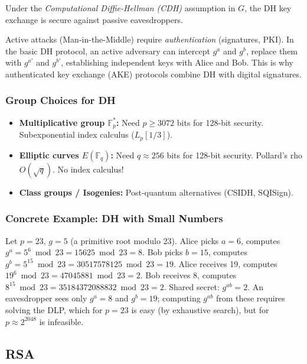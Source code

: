 \begin{theorem}[Security of DH]
Under the \emph{Computational Diffie-Hellman (CDH)} assumption in $G$, the DH key exchange is secure against passive eavesdroppers.
\end{theorem}

Active attacks (Man-in-the-Middle) require \emph{authentication} (signatures, PKI). In the basic DH protocol, an active adversary can intercept $g^a$ and $g^b$, replace them with $g^{a'}$ and $g^{b'}$, establishing independent keys with Alice and Bob. This is why authenticated key exchange (AKE) protocols combine DH with digital signatures.

\subsubsection*{Group Choices for DH}
\begin{itemize}
\item \textbf{Multiplicative group $\mathbb{F}_p^*$:} Need $p \ge 3072$ bits for 128-bit security. Subexponential index calculus ($L_p[1/3]$).
\item \textbf{Elliptic curves $E(\mathbb{F}_q)$:} Need $q \approx 256$ bits for 128-bit security. Pollard's rho $O(\sqrt{q})$. No index calculus!
\item \textbf{Class groups / Isogenies:} Post-quantum alternatives (CSIDH, SQISign).
\end{itemize}

\subsubsection*{Concrete Example: DH with Small Numbers}
Let $p = 23$, $g = 5$ (a primitive root modulo 23). Alice picks $a = 6$, computes $g^a = 5^6 \bmod 23 = 15625 \bmod 23 = 8$. Bob picks $b = 15$, computes $g^b = 5^{15} \bmod 23 = 30517578125 \bmod 23 = 19$. Alice receives 19, computes $19^6 \bmod 23 = 47045881 \bmod 23 = 2$. Bob receives 8, computes $8^{15} \bmod 23 = 35184372088832 \bmod 23 = 2$. Shared secret: $g^{ab} = 2$. An eavesdropper sees only $g^a = 8$ and $g^b = 19$; computing $g^{ab}$ from these requires solving the DLP, which for $p=23$ is easy (by exhaustive search), but for $p \approx 2^{2048}$ is infeasible.

\subsection{RSA}
\label{sec:crypto:rsa}

